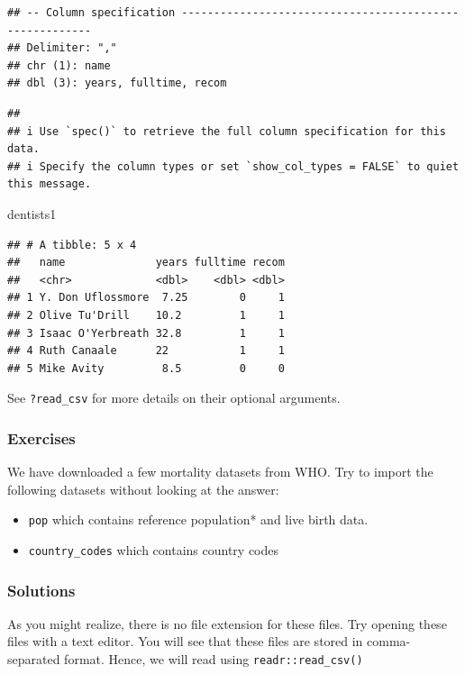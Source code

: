 \documentclass[
]{book}
\newenvironment{Shaded}{\begin{snugshade}}{\end{snugshade}}
\newcommand{\NormalTok}[1]{#1}
\providecommand{\tightlist}{%
  \setlength{\itemsep}{0pt}\setlength{\parskip}{0pt}}
\begin{document}
\begin{verbatim}
## -- Column specification --------------------------------------------------------
## Delimiter: ","
## chr (1): name
## dbl (3): years, fulltime, recom
\end{verbatim}

\begin{verbatim}
## 
## i Use `spec()` to retrieve the full column specification for this data.
## i Specify the column types or set `show_col_types = FALSE` to quiet this message.
\end{verbatim}

\begin{Shaded}
\begin{Highlighting}[]
\NormalTok{dentists1}
\end{Highlighting}
\end{Shaded}

\begin{verbatim}
## # A tibble: 5 x 4
##   name              years fulltime recom
##   <chr>             <dbl>    <dbl> <dbl>
## 1 Y. Don Uflossmore  7.25        0     1
## 2 Olive Tu'Drill    10.2         1     1
## 3 Isaac O'Yerbreath 32.8         1     1
## 4 Ruth Canaale      22           1     1
## 5 Mike Avity         8.5         0     0
\end{verbatim}

See \texttt{?read\_csv} for more details on their optional arguments.

\hypertarget{exercises}{%
\subsubsection{Exercises}\label{exercises}}

We have downloaded a few mortality datasets from WHO. Try to import the following datasets without looking at the answer:

\begin{itemize}
\tightlist
\item
  \texttt{pop} which contains reference population* and live birth data.
\item
  \texttt{country\_codes} which contains country codes
\end{itemize}

\hypertarget{solutions}{%
\subsubsection{Solutions}\label{solutions}}

As you might realize, there is no file extension for these files. Try opening these files with a text editor. You will see that these files are stored in comma-separated format. Hence, we will read using \texttt{readr::read\_csv()}
\end{document}
